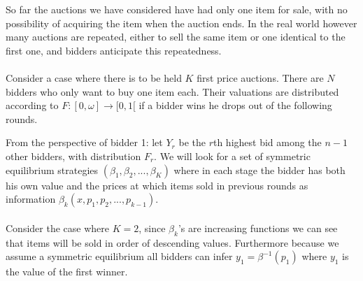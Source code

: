 So far the auctions we have considered have had only one item for sale, with no possibility of acquiring the item when the auction ends. In the real world however many auctions are repeated, either to sell the same item or one identical to the first one, and bidders anticipate this repeatedness. 
\\ \\
Consider a case where there is to be held $K$ first price auctions. There are $N$ bidders who only want to buy one item each. Their valuations are distributed according to $F:[0,\omega]\rightarrow [0,1[$ if a bidder wins he drops out of the following rounds. 

From the perspective of bidder 1: let $Y_r$ be the $r$th highest bid among the $n-1$ other bidders, with distribution $F_r$. We will look for a set of symmetric equilibrium strategies $(\beta_1, \beta_2, ..., \beta_K)$ where in each stage the bidder has both his own value and the prices at which items sold in previous rounds as information $\beta_k(x, p_1, p_2,...,p_{k-1})$. 
\\\\ 
Consider the case where $K=2$, since $\beta_k$'s are increasing functions we can see that items will be sold in order of descending values. Furthermore because we assume a symmetric equilibrium all bidders can infer $y_1 = \beta^{-1}(p_1)$ where $y_1$ is the value of the first winner. 

